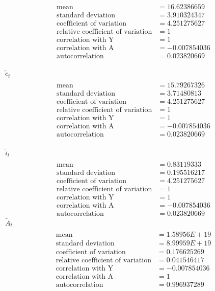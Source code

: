 \documentclass[letterpaper,12pt]{article}
\theoremstyle{definition}
\begin{document}
\begin{align*}
\\\text{mean} &= 16.62386659
\\\text{standard deviation} &= 3.910324347
\\\text{coefficient of variation}&=4.251275627
\\\text{relative coefficient of variation}&=1
\\\text{correlation with Y}&=1
\\\text{correlation with A}&=-0.007854036
\\\text{autocorrelation}&=0.023820669
\end{align*}
\\
$\tilde{c}_t$
\begin{align*}
\\\text{mean} &= 15.79267326
\\\text{standard deviation} &=3.71480813
\\\text{coefficient of variation}&=4.251275627
\\\text{relative coefficient of variation}&=1
\\\text{correlation with Y}&=1
\\\text{correlation with A}&=-0.007854036
\\\text{autocorrelation}&=0.023820669
\end{align*}
\\
$\tilde{i}_t$
\begin{align*}
\\\text{mean} &= 0.83119333
\\\text{standard deviation} &= 0.195516217
\\\text{coefficient of variation}&=4.251275627
\\\text{relative coefficient of variation}&=1
\\\text{correlation with Y}&=1
\\\text{correlation with A}&=-0.007854036
\\\text{autocorrelation}&=0.023820669
\end{align*}
$\tilde{A}_t$
\begin{align*}
\\\text{mean} &= 1.58956E+19
\\\text{standard deviation} &= 8.99959E+19
\\\text{coefficient of variation}&=0.176625269
\\\text{relative coefficient of variation}&=0.041546417
\\\text{correlation with Y}&=-0.007854036
\\\text{correlation with A}&=1
\\\text{autocorrelation}&=0.996937289
\end{align*}
\end{document}
